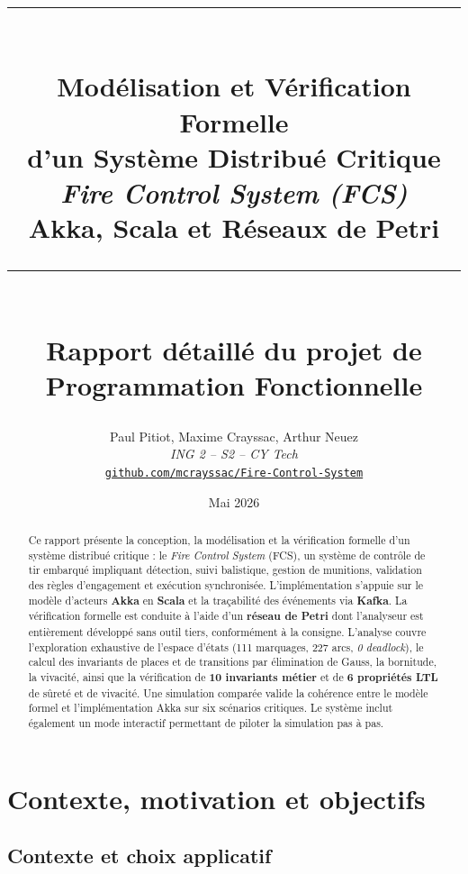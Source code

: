 \documentclass[11pt,a4paper]{article}
\title{
  \vspace{-1.5cm}
  \rule{\linewidth}{0.4pt}\\[0.4cm]
  {\Huge \bfseries Modélisation et Vérification Formelle\\[0.3em]
   d'un Système Distribué Critique}\\[0.4cm]
  {\Large \itshape Fire Control System (FCS)}\\[0.2cm]
  {\large Akka, Scala et Réseaux de Petri}\\[0.2cm]
  \rule{\linewidth}{0.4pt}\\[0.6cm]
  {\large Rapport détaillé du projet de Programmation Fonctionnelle}
}
\author{
  Paul Pitiot, Maxime Crayssac, Arthur Neuez\\
  \textit{ING 2 -- S2 -- CY Tech} \\[0.2em]
  \href{https://github.com/mcrayssac/Fire-Control-System}{\texttt{github.com/mcrayssac/Fire-Control-System}}
}
\date{Mai 2026}
\begin{document}
\maketitle
\thispagestyle{empty}

\begin{abstract}
\noindent
Ce rapport présente la conception, la modélisation et la vérification formelle d'un
système distribué critique : le \emph{Fire Control System} (FCS), un système de
contrôle de tir embarqué impliquant détection, suivi balistique, gestion de munitions,
validation des règles d'engagement et exécution synchronisée. L'implémentation
s'appuie sur le modèle d'acteurs \textbf{Akka} en \textbf{Scala} et la traçabilité des
événements via \textbf{Kafka}. La vérification formelle est conduite à l'aide d'un
\textbf{réseau de Petri} dont l'analyseur est entièrement développé sans outil tiers,
conformément à la consigne. L'analyse couvre l'exploration exhaustive de l'espace
d'états (111 marquages, 227 arcs, \emph{0 deadlock}), le calcul des invariants de
places et de transitions par élimination de Gauss, la bornitude, la vivacité, ainsi
que la vérification de \textbf{10 invariants métier} et de \textbf{6 propriétés LTL}
de sûreté et de vivacité. Une simulation comparée valide la cohérence entre le
modèle formel et l'implémentation Akka sur six scénarios critiques. Le système
inclut également un mode interactif permettant de piloter la simulation pas à pas.
\end{abstract}

\vspace{0.3cm}
\begin{center}
\end{center}

\newpage
\tableofcontents
\newpage

\section{Contexte, motivation et objectifs}

\subsection{Contexte et choix applicatif}
\end{document}
